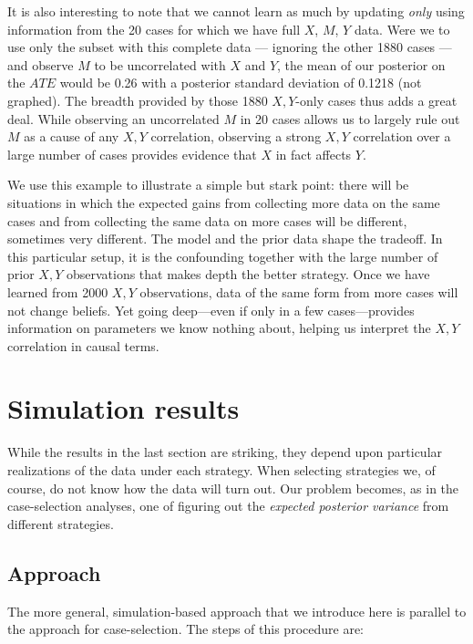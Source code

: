 \documentclass[
  12pt,
]{book}
\begin{document}
It is also interesting to note that we cannot learn as much by updating \emph{only} using information from the 20 cases for which we have full \(X\), \(M\), \(Y\) data. Were we to use only the subset with this complete data --- ignoring the other 1880 cases --- and observe \(M\) to be uncorrelated with \(X\) and \(Y\), the mean of our posterior on the \(ATE\) would be 0.26 with a posterior standard deviation of 0.1218 (not graphed). The breadth provided by those 1880 \(X,Y\)-only cases thus adds a great deal. While observing an uncorrelated \(M\) in 20 cases allows us to largely rule out \(M\) as a cause of any \(X,Y\) correlation, observing a strong \(X,Y\) correlation over a large number of cases provides evidence that \(X\) in fact affects \(Y\).

We use this example to illustrate a simple but stark point: there will be situations in which the expected gains from collecting more data on the same cases and from collecting the same data on more cases will be different, sometimes very different. The model and the prior data shape the tradeoff. In this particular setup, it is the confounding together with the large number of prior \(X,Y\) observations that makes depth the better strategy. Once we have learned from 2000 \(X,Y\) observations, data of the same form from more cases will not change beliefs. Yet going deep---even if only in a few cases---provides information on parameters we know nothing about, helping us interpret the \(X,Y\) correlation in causal terms.

\hypertarget{simulation-results-1}{%
\section{Simulation results}\label{simulation-results-1}}

While the results in the last section are striking, they depend upon particular realizations of the data under each strategy. When selecting strategies we, of course, do not know how the data will turn out. Our problem becomes, as in the case-selection analyses, one of figuring out the \emph{expected posterior variance} from different strategies.

\hypertarget{approach}{%
\subsection{Approach}\label{approach}}

The more general, simulation-based approach that we introduce here is parallel to the approach for case-selection. The steps of this procedure are:
\end{document}
